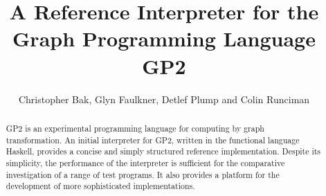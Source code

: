 \documentclass{eptcs}
\begin{document}
\title{A Reference Interpreter for the Graph Programming Language GP2}

\author{Christopher Bak, Glyn Faulkner, Detlef Plump and Colin Runciman
}

\def\authorrunning{C. Bak, G. Faulkner, D. Plump \& C. Runciman} 
\def\titlerunning{A Reference Interpreter for Graph Programs}

\maketitle
\thispagestyle{empty}


\begin{abstract}
GP2 is an experimental programming language
for computing by graph transformation.
An initial interpreter for GP2, written
in the functional language Haskell, provides
a concise and simply structured reference
implementation.
Despite its simplicity, the performance of
the interpreter is sufficient for the
comparative investigation of a range of test
programs.
It also provides a platform for the development
of more sophisticated implementations.
\end{abstract}









{}

\end{document}
